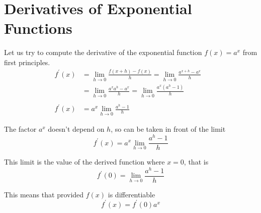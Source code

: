 %
%
%
%
%
%
%
%
%
%
%

\section{Derivatives of Exponential Functions}
Let us try to compute the derivative of the exponential function $f (x) =a^{x}$ from first principles.
\begin{align*}f^{ \prime } (x) &  = \underset{h \rightarrow 0}{\lim }\frac{f (x +h) -f (x)}{h} =\underset{h \rightarrow 0}{\lim }\frac{a^{x +h} -a^{x}}{h} \\
 &  = \underset{h \rightarrow 0}{\lim }\frac{a^{x} a^{h} -a^{x}}{h} =\underset{h \rightarrow 0}{\lim }\frac{a^{x} \left (a^{h} -1\right )}{h} \\
\, &  &  \\
f^{ \prime } (x) &  = a^{x} \underset{h \rightarrow 0}{\lim }\frac{a^{h} -1}{h}\end{align*}

The factor $a^{x}$ doesn't depend on $h$, so can be taken in front of the limit
\begin{equation*}f^{ \prime } (x) =a^{x} \underset{h \rightarrow 0}{\lim }\frac{a^{h} -1}{h}
\end{equation*}

This limit is the value of the derived function where $x =0$, that is
\begin{equation*}f^{ \prime } (0) =\underset{h \rightarrow 0}{\lim }\frac{a^{h} -1}{h}
\end{equation*}

This means that provided $f (x)$ is differentiable
\begin{equation*}f^{ \prime } (x) =f^{ \prime } (0) a^{x}
\end{equation*}

